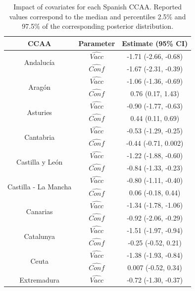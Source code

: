 \documentclass{article}
\begin{document}
\begin{table}[h]
\small\sf\centering
\caption{Impact of covariates for each Spanish CCAA. Reported values correspond to the median and percentiles 2.5\% and 97.5\% of the corresponding posterior distribution.\label{tab:ccaa_est2}}
\begin{tabular}{ccc}
\toprule
CCAA & Parameter & Estimate (95\% CI)\\
\midrule
\multirow{2}{*}{Andaluc\'ia}  & $\hat{Vacc}$  & -1.71 (-2.66, -0.68) \\
                              & $\hat{Conf}$  & -1.67 (-2.31, -0.39) \\
\midrule
\multirow{2}{*}{Arag\'on}    & $\hat{Vacc}$  & -1.06 (-1.36, -0.69) \\
                             & $\hat{Conf}$  & 0.76 (0.17, 1.43) \\
\midrule
\multirow{2}{*}{Asturies}    & $\hat{Vacc}$  & -0.90 (-1.77, -0.63) \\
                             & $\hat{Conf}$  & 0.44 (0.11, 0.69) \\
\midrule
\multirow{2}{*}{Cantabria}    & $\hat{Vacc}$  & -0.53 (-1.29, -0.25) \\
                              & $\hat{Conf}$  & -0.44 (-0.71, 0.002) \\
\midrule
\multirow{2}{*}{Castilla y Le\'on}    & $\hat{Vacc}$  & -1.22 (-1.88, -0.60) \\
                                      & $\hat{Conf}$  & -0.84 (-1.33, -0.23) \\
\midrule
\multirow{2}{*}{Castilla - La Mancha}    & $\hat{Vacc}$  & -0.80 (-1.11, -0.40) \\
                                         & $\hat{Conf}$  & 0.06 (-0.18, 0.44) \\
\midrule
\multirow{2}{*}{Canarias}    & $\hat{Vacc}$  & -1.34 (-1.78, -1.06) \\
                              & $\hat{Conf}$ & -0.92 (-2.06, -0.29) \\
\midrule
\multirow{2}{*}{Catalunya}    & $\hat{Vacc}$  & -1.51 (-1.97, -0.94) \\
                              & $\hat{Conf}$  & -0.25 (-0.52, 0.21) \\
\midrule
\multirow{2}{*}{Ceuta}    & $\hat{Vacc}$  & -1.38 (-1.93, -0.84) \\
                          & $\hat{Conf}$  & 0.007 (-0.52, 0.34) \\
\midrule
\multirow{2}{*}{Extremadura}    & $\hat{Vacc}$  & -0.72 (-1.30, -0.37) \\

\end{tabular}
\end{table}
\end{document}

